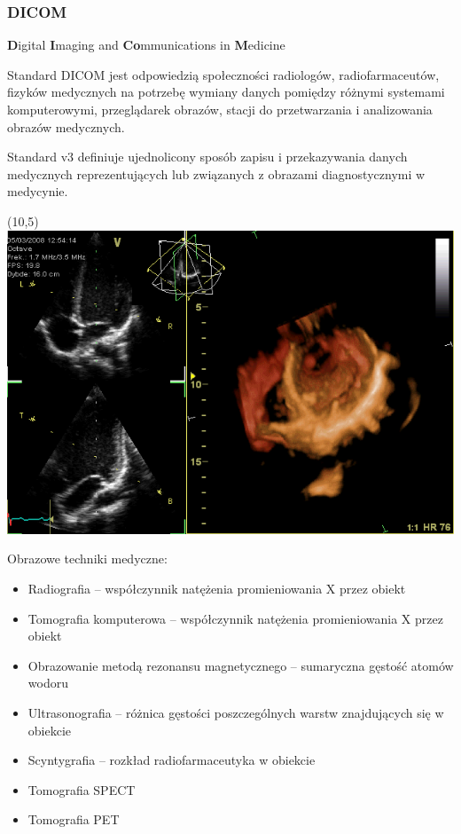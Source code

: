 \documentclass[aspectratio=169]{beamer}
\begin{document}
\begin{frame}[t]
    \frametitle{DICOM}
    \normalsize
    \textbf{D}igital \textbf{I}maging and \textbf{Co}mmunications in \textbf{M}edicine

    \vspace{1em}
    \scriptsize
    Standard DICOM jest odpowiedzią społeczności radiologów, radiofarmaceutów, fizyków medycznych na potrzebę wymiany danych pomiędzy różnymi systemami komputerowymi, przeglądarek obrazów, stacji do przetwarzania i analizowania obrazów medycznych.

    \vspace{1em}
    Standard \DICOM v3 definiuje ujednolicony sposób zapisu i przekazywania danych medycznych reprezentujących lub związanych z obrazami diagnostycznymi w medycynie.

    \begin{textblock}{5}(10,5)
        \includegraphics[height=0.4\textheight]{img/usg.png}
    \end{textblock}

    \vspace{1em}
    \normalsize
    Obrazowe techniki medyczne:
    \scriptsize
    \begin{itemize}
        \item Radiografia -- współczynnik natężenia promieniowania X przez obiekt
        \item Tomografia komputerowa -- współczynnik natężenia promieniowania X przez obiekt
        \item Obrazowanie metodą rezonansu magnetycznego -- sumaryczna gęstość atomów wodoru
        \item Ultrasonografia -- różnica gęstości poszczególnych warstw znajdujących się w obiekcie
        \item Scyntygrafia -- rozkład radiofarmaceutyka w obiekcie
        \item Tomografia SPECT
        \item Tomografia PET
    \end{itemize}

\end{frame}
\end{document}
